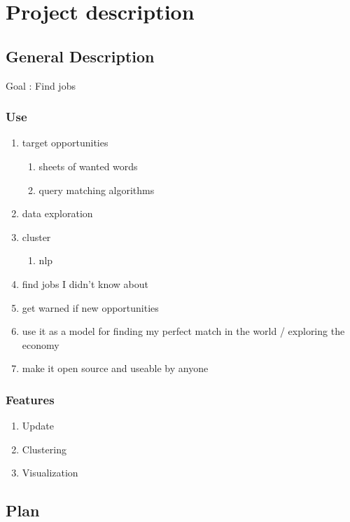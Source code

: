 \documentclass[11pt]{article}
\author{teddd}
\date{\today}
\title{}
\begin{document}
\tableofcontents

\section{Project description}
\label{sec:org5d73a31}
\subsection{General Description}
\label{sec:orgd7025d0}
Goal : Find jobs
\subsubsection{Use}
\label{sec:org4a57949}
\begin{enumerate}
\item target opportunities
\label{sec:org0733151}
\begin{enumerate}
\item sheets of wanted words
\label{sec:org05a9acb}
\item query matching algorithms
\label{sec:org996a336}
\end{enumerate}
\item data exploration
\label{sec:orgdba73f5}
\item cluster
\label{sec:org800a7fb}
\begin{enumerate}
\item nlp
\label{sec:org860c87d}
\end{enumerate}
\item find jobs I didn't know about
\label{sec:org8700713}
\item get warned if new opportunities
\label{sec:org8a1ac34}
\item use it as a model for finding my perfect match in the world / exploring the economy
\label{sec:orgc7650f6}
\item make it open source and useable by anyone
\label{sec:org4ccd3a0}
\end{enumerate}
\subsubsection{Features}
\label{sec:org4c643df}
\begin{enumerate}
\item Update
\label{sec:orgd324c12}
\item Clustering
\label{sec:orge495072}
\item Visualization
\label{sec:org0ae0224}
\end{enumerate}
\subsection{Plan}
\label{sec:org61cd138}
\end{document}
